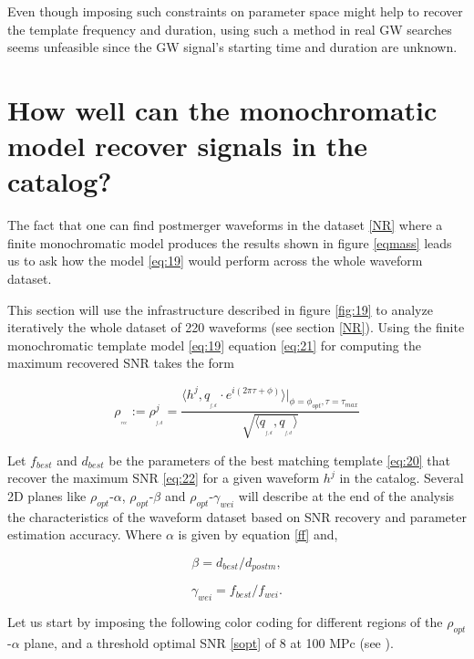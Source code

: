 Even though imposing such constraints on parameter space might help to recover the template frequency and duration, using such a method in real GW searches seems unfeasible since the GW signal's starting time and duration are unknown.

\newpage
\section{How well can the monochromatic model recover signals in the catalog?}

The fact that one can find postmerger waveforms in the dataset \ref{NR} where a finite monochromatic model produces the results shown in figure \ref{eqmass} leads us to ask how the model \ref{eq:19} would perform across the whole waveform dataset. 
 
This section will use the infrastructure described in figure \ref{fig:19} to analyze iteratively the whole dataset of 220 waveforms (see section \ref{NR}). Using the finite monochromatic template model \ref{eq:19} equation \ref{eq:21} for computing the maximum recovered SNR takes the form



\begin{equation}\label{eq:22}
\rho_{_{_{rec}}} := \rho^j_{_{_{f,d}}} = \frac{\langle h^j, q_{_{_{f,d}}}\cdot e^{i(2\pi \tau+\phi)}\rangle \bigg\rvert_{\phi =\phi_{opt},\tau =\tau_{max}}}{\sqrt{\langle  q_{_{_{f,d}}},q_{_{_{f,d}}} \rangle}}
\end{equation}


Let $f_{best}$ and $d_{best}$ be the parameters of the best matching template \ref{eq:20} that recover the maximum SNR \ref{eq:22}  for a given waveform $h^j$ in the catalog. Several 2D planes like $\rho_{opt}$-$\alpha$, $\rho_{opt}$-$\beta$ and $\rho_{opt}$-$\gamma_{wei}$ will describe at the end of the analysis the characteristics of the waveform dataset based on SNR recovery and parameter estimation accuracy. Where $\alpha$ is given by equation \ref{ff} and,

\begin{equation}
\beta=d_{best}/d_{postm},
\end{equation}

\begin{equation}
\gamma_{wei}=f_{best}/f_{wei}.
\end{equation}

Let us start by imposing the following color coding for different regions of the $\rho_{opt}$-$\alpha$ plane, and a threshold optimal SNR \ref{sopt} of 8 at 100 MPc (see \cite[section 3]{https://doi.org/10.48550/arxiv.2109.09882}).


